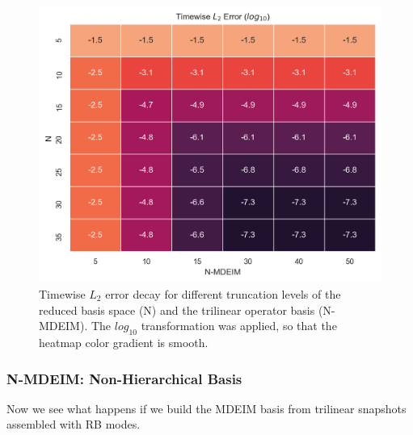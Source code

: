 \documentclass[../../thesis.tex]{subfiles}
\begin{document}
\begin{figure}
    \centering
    \includegraphics[width=1\columnwidth]{research_project/piston/figures/mdeim_certification/error_decay_heatmap.png}
    \caption{Timewise $L_2$ error decay for different truncation levels 
    of the reduced basis space (N) 
    and the trilinear operator basis (N-MDEIM).
    The $log_{10}$ transformation was applied, so that the heatmap color gradient is smooth.}
    \label{fig:nonlinear_error_decay_heatmap}
\end{figure}

\subsubsection{N-MDEIM: Non-Hierarchical Basis}
\label{sec:us_non-hierarchical_basis}
Now we see what happens if we build the MDEIM basis 
from trilinear snapshots assembled with RB modes.
\end{document}
